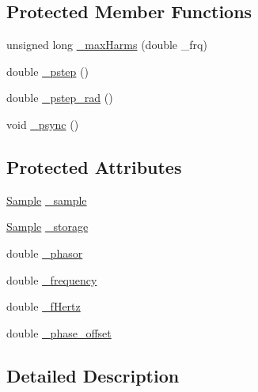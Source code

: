 \subsection*{Protected Member Functions}
\begin{DoxyCompactItemize}
\item 
unsigned long \hyperlink{classSignal_1_1Fourier_1_1FourierGenerator_a99720416bd9ff96636f4acf956a785d5}{\+\_\+max\+Harms} (double \+\_\+frq)
\item 
double \hyperlink{classSignal_1_1Fourier_1_1FourierGenerator_adbf50b2a1f3e7561d22685911d1e6ba1}{\+\_\+pstep} ()
\item 
double \hyperlink{classSignal_1_1Fourier_1_1FourierGenerator_a98f819feb7bb2f7b61dbcc7f9863c972}{\+\_\+pstep\+\_\+rad} ()
\item 
void \hyperlink{classSignal_1_1Fourier_1_1FourierGenerator_a592716ed0677d9bc503c981dae33ee45}{\+\_\+psync} ()
\end{DoxyCompactItemize}
\subsection*{Protected Attributes}
\begin{DoxyCompactItemize}
\item 
\hyperlink{classSignal_1_1Sample}{Sample} \hyperlink{classSignal_1_1Fourier_1_1FourierGenerator_ad720bf2b268dc621ace64c54c0816597}{\+\_\+sample}
\item 
\hyperlink{classSignal_1_1Sample}{Sample} \hyperlink{classSignal_1_1Fourier_1_1FourierGenerator_ab6e6b79cf56e31c9a1b5766f357f8cfb}{\+\_\+storage}
\item 
double \hyperlink{classSignal_1_1Fourier_1_1FourierGenerator_a5c5d5bb54df2a21f1a6142530adb08c3}{\+\_\+phasor}
\item 
double \hyperlink{classSignal_1_1SignalGenerator_a7f107461333bce68c5dad412db96a8c2}{\+\_\+frequency}
\item 
double \hyperlink{classSignal_1_1SignalGenerator_a85a4702347352bab1c71e0a8df8437d6}{\+\_\+f\+Hertz}
\item 
double \hyperlink{classSignal_1_1SignalGenerator_a6b4444d46747c8517171edbbf4b5588f}{\+\_\+phase\+\_\+offset}
\end{DoxyCompactItemize}


\subsection{Detailed Description}


